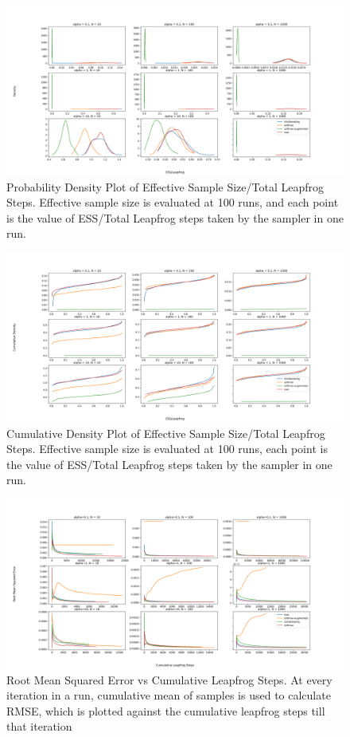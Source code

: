 \documentclass[11pt]{article}
\begin{document}
\begin{figure}[t!]
    \centering
    \includegraphics[width=1.2\textwidth]{figures/simplex/ess_density.png}
    \caption{Probability Density Plot of Effective Sample Size/Total Leapfrog Steps. Effective sample size is evaluated at 100 runs, and each point is the value of ESS/Total Leapfrog steps taken by the sampler in one run.}
    \label{fig:ess_density}
\end{figure}

\begin{figure}[t!]
    \centering
    \includegraphics[width=1.2\textwidth]{figures/simplex/ess_cdf.png}
    \caption{Cumulative Density Plot of Effective Sample Size/Total Leapfrog Steps. Effective sample size is evaluated at 100 runs, each point is the value of ESS/Total Leapfrog steps taken by the sampler in one run.}
    \label{fig:ess_cdf}
\end{figure}

\begin{figure}[t!]
    \centering
    \includegraphics[width=1.2\textwidth]{figures/simplex/rmse.png}
    \caption{Root Mean Squared Error vs Cumulative Leapfrog Steps. At every iteration in a run, cumulative mean of samples is used to calculate RMSE, which is plotted against the cumulative leapfrog steps till that iteration}
    \label{fig:rmse}
\end{figure}
\end{document}
